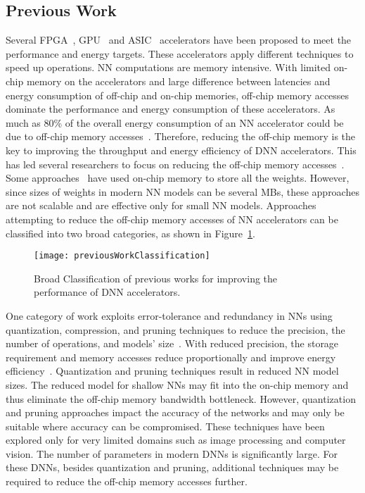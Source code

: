 \subsection{Previous Work}
Several FPGA~\cite{zhang2015optimizing,wei2019overcoming,gokhale2014240,8742284,gupta2015deep,alwani2016fused}, GPU~\cite{chetlur2014cudnn} and ASIC~\cite{Chen2016EyerissAS,chen2014diannao,chen2014dadiannao,du2015shidiannao} accelerators have been proposed to meet the performance and energy targets. These accelerators apply different techniques to speed up operations. NN computations are memory intensive. With limited on-chip memory on the accelerators and large difference between latencies and energy consumption of off-chip and on-chip memories, off-chip memory accesses dominate the performance and energy consumption of these accelerators. As much as 80\% of the overall energy consumption
of an NN accelerator could be due to off-chip memory accesses~\cite{chen2014diannao}. Therefore, reducing the off-chip memory is the key to improving the throughput and energy efficiency of DNN accelerators. This has led several researchers to focus on reducing the off-chip
memory accesses~\cite{chen2014diannao,chen2016eyeriss,zhang2015optimizing}. Some approaches~\cite{lee2016fpga, rybalkin2018finn, ferreira2016fpga} have used on-chip memory to
store all the weights. However, since sizes of weights in modern NN models can be several MBs, these approaches are not scalable and are effective only for small NN models. Approaches attempting to reduce the off-chip memory accesses of NN accelerators can be classified into two broad categories, as shown in Figure~\ref{fig:previousWorkClassification}. 

\begin{figure}[!htb]
	\centering
	\captionsetup{font=sf}
	\texttt{[image: previousWorkClassification]}
	\caption{Broad Classification of previous works for improving the performance of DNN accelerators.}
	\label{fig:previousWorkClassification}
\end{figure}

One category of work exploits error-tolerance and redundancy in NNs using quantization, compression, and pruning techniques to reduce the precision, the number of operations, and models' size~\cite{ferreira2016fpga,wang2018c,chang2015recurrent,han2017ese,lee2016fpga}. With reduced precision, the storage requirement and memory accesses reduce proportionally and improve energy efficiency~\cite{sze2017efficient}. Quantization and pruning techniques result in reduced NN model sizes. The reduced model for shallow NNs may fit into the on-chip memory and thus eliminate the off-chip memory bandwidth bottleneck. However, quantization and pruning approaches impact the accuracy of the networks and may only be suitable where accuracy can be compromised. These techniques have been explored only for very limited domains such as image
processing and computer vision. The number of parameters in modern DNNs is significantly large. For these DNNs, besides quantization and pruning, additional techniques may be required to reduce the off-chip memory accesses further.

